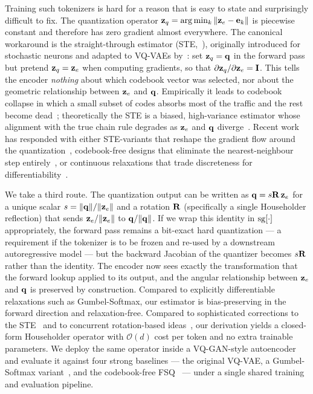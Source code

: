 Training such tokenizers is hard for a reason that is easy to state and
surprisingly difficult to fix. The quantization operator
$\mathbf{z}_q = \arg\min_{k} \|\mathbf{z}_e - \mathbf{e}_k\|$ is piecewise constant and
therefore has zero gradient almost everywhere. The canonical workaround
is the straight-through estimator (STE,~\citealp{bengio2013ste}),
originally introduced for stochastic neurons and adapted to VQ-VAEs
by~\citet{vandenoord2017vqvae}: set $\mathbf{z}_q = \mathbf{q}$ in the forward pass
but pretend $\mathbf{z}_q = \mathbf{z}_e$ when computing gradients, so that
$\partial \mathbf{z}_q / \partial \mathbf{z}_e = \mathbf{I}$. This tells the encoder
\emph{nothing} about which codebook vector was selected, nor about the
geometric relationship between $\mathbf{z}_e$ and $\mathbf{q}$. Empirically it leads
to codebook collapse in which a small subset of codes absorbs most of
the traffic and the rest become
dead~\citep{razavi2019vqvae2,huh2023straighteningste,
zheng2023onlineclustered}; theoretically the STE is a biased,
high-variance estimator whose alignment with the true chain rule
degrades as $\mathbf{z}_e$ and $\mathbf{q}$ diverge~\citep{liu2023discretebackprop,
shah2024decoupledste}. Recent work has responded with either
STE-variants that reshape the gradient flow around the
quantization~\citep{huh2023straighteningste,shah2024decoupledste},
codebook-free designs that eliminate the nearest-neighbour step
entirely~\citep{mentzer2024fsq}, or continuous relaxations that
trade discreteness for
differentiability~\citep{jang2017gumbel,maddison2017concrete}.

We take a third route. The quantization output can be written as
$\mathbf{q} = s\mathbf{R}\,\mathbf{z}_e$ for a unique scalar $s=\|\mathbf{q}\|/\|\mathbf{z}_e\|$ and a
rotation $\mathbf{R}$ (specifically a single Householder reflection) that
sends $\mathbf{z}_e/\|\mathbf{z}_e\|$ to $\mathbf{q}/\|\mathbf{q}\|$. If we wrap this identity in
$\operatorname{sg}\!\left[\cdot\right]$ appropriately, the forward pass remains a bit-exact hard
quantization --- a requirement if the tokenizer is to be frozen and
re-used by a downstream autoregressive model --- but the backward
Jacobian of the quantizer becomes $s\mathbf{R}$ rather than the identity.
The encoder now sees exactly the transformation that the forward
lookup applied to its output, and the angular relationship between
$\mathbf{z}_e$ and $\mathbf{q}$ is preserved by construction. Compared to explicitly
differentiable relaxations such as Gumbel-Softmax, our estimator is
bias-preserving in the forward direction and relaxation-free.
Compared to sophisticated corrections to the
STE~\citep{huh2023straighteningste,shah2024decoupledste} and to
concurrent rotation-based ideas~\citep{fifty2024rotation}, our
derivation yields a closed-form Householder operator with
$\mathcal{O}(d)$ cost per token and no extra trainable parameters.
We deploy the same operator inside a VQ-GAN-style autoencoder and
evaluate it against four strong baselines --- the original VQ-VAE, a
Gumbel-Softmax variant~\citep{jang2017gumbel,maddison2017concrete},
and the codebook-free FSQ~\citep{mentzer2024fsq} --- under a single
shared training and evaluation pipeline.

